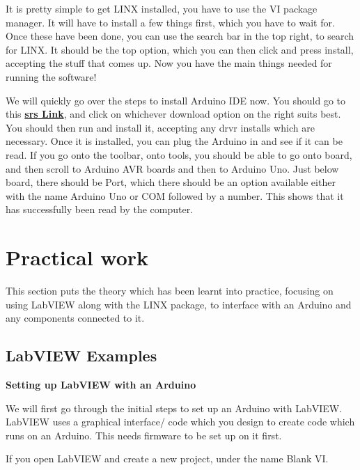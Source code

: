 \documentclass[a4paper,11pt]{report}
\let\oldhref\href %
\renewcommand{\href}[2]{\oldhref{#1}{\bf\gls{srs} #2}}
\begin{document}
It is pretty simple to get LINX installed, you have to use the VI package manager. It will have to install a few things first, which you have to wait for. Once these have been done, you can use the search bar in the top right, to search for LINX. It should be the top option, which you can then click and press install, accepting the stuff that comes up. Now you have the main things needed for running the software!

We will quickly go over the steps to install Arduino IDE now. You should go to this \href{https://www.arduino.cc/en/software}{Link}, and click on whichever download option on the right suits best. You should then run and install it, accepting any \gls{drvr} installs which are necessary. Once it is installed, you can plug the Arduino in and see if it can be read. If you go onto the toolbar, onto tools, you should be able to go onto board, and then scroll to Arduino AVR boards and then to Arduino Uno. Just below board, there should be Port, which there should be an option available either with the name Arduino Uno or COM followed by a number. This shows that it has successfully been read by the computer.

\pagebreak

\section{Practical work}

This section puts the theory which has been learnt into practice, focusing on using LabVIEW along with the LINX package, to interface with an Arduino and any components connected to it.

\vspace*{1\baselineskip}

\subsection{LabVIEW Examples}

\textbf{Setting up LabVIEW with an Arduino}

We will first go through the initial steps to set up an Arduino with LabVIEW. LabVIEW uses a graphical interface/ code which you design to create code which runs on an Arduino. This needs firmware to be set up on it first.

If you open LabVIEW and create a new project, under the name Blank VI.
\end{document}
